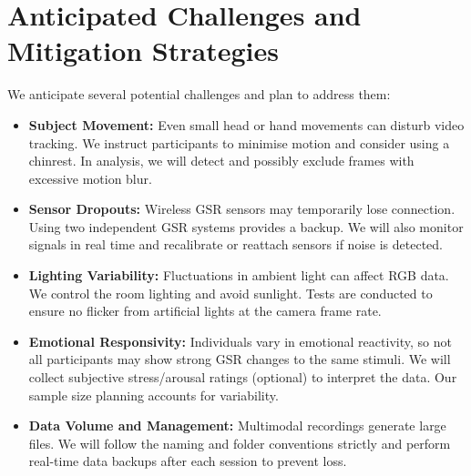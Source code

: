 \documentclass{article}
\begin{document}
\section{Anticipated Challenges and Mitigation Strategies}
We anticipate several potential challenges and plan to address them:
\begin{itemize}
    \item \textbf{Subject Movement:} Even small head or hand movements can disturb video tracking. We instruct participants to minimise motion and consider using a chinrest. In analysis, we will detect and possibly exclude frames with excessive motion blur.
    \item \textbf{Sensor Dropouts:} Wireless GSR sensors may temporarily lose connection. Using two independent GSR systems provides a backup. We will also monitor signals in real time and recalibrate or reattach sensors if noise is detected.
    \item \textbf{Lighting Variability:} Fluctuations in ambient light can affect RGB data. We control the room lighting and avoid sunlight. Tests are conducted to ensure no flicker from artificial lights at the camera frame rate.
    \item \textbf{Emotional Responsivity:} Individuals vary in emotional reactivity, so not all participants may show strong GSR changes to the same stimuli. We will collect subjective stress/arousal ratings (optional) to interpret the data. Our sample size planning accounts for variability.
    \item \textbf{Data Volume and Management:} Multimodal recordings generate large files. We will follow the naming and folder conventions strictly and perform real-time data backups after each session to prevent loss.
\end{itemize}
\end{document}
